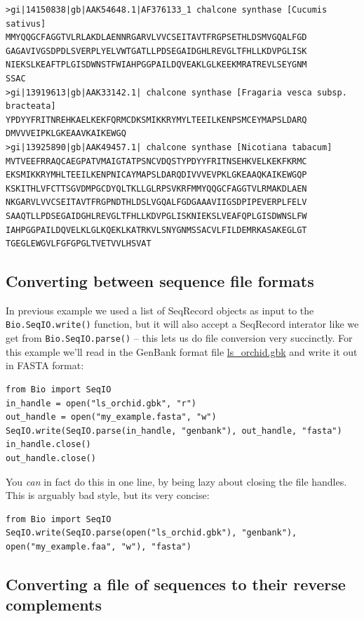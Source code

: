 \documentclass{report}
\begin{document}
\begin{verbatim}
>gi|14150838|gb|AAK54648.1|AF376133_1 chalcone synthase [Cucumis sativus]
MMYQQGCFAGGTVLRLAKDLAENNRGARVLVVCSEITAVTFRGPSETHLDSMVGQALFGD
GAGAVIVGSDPDLSVERPLYELVWTGATLLPDSEGAIDGHLREVGLTFHLLKDVPGLISK
NIEKSLKEAFTPLGISDWNSTFWIAHPGGPAILDQVEAKLGLKEEKMRATREVLSEYGNM
SSAC
>gi|13919613|gb|AAK33142.1| chalcone synthase [Fragaria vesca subsp. bracteata]
YPDYYFRITNREHKAELKEKFQRMCDKSMIKKRYMYLTEEILKENPSMCEYMAPSLDARQ
DMVVVEIPKLGKEAAVKAIKEWGQ
>gi|13925890|gb|AAK49457.1| chalcone synthase [Nicotiana tabacum]
MVTVEEFRRAQCAEGPATVMAIGTATPSNCVDQSTYPDYYFRITNSEHKVELKEKFKRMC
EKSMIKKRYMHLTEEILKENPNICAYMAPSLDARQDIVVVEVPKLGKEAAQKAIKEWGQP
KSKITHLVFCTTSGVDMPGCDYQLTKLLGLRPSVKRFMMYQQGCFAGGTVLRMAKDLAEN
NKGARVLVVCSEITAVTFRGPNDTHLDSLVGQALFGDGAAAVIIGSDPIPEVERPLFELV
SAAQTLLPDSEGAIDGHLREVGLTFHLLKDVPGLISKNIEKSLVEAFQPLGISDWNSLFW
IAHPGGPAILDQVELKLGLKQEKLKATRKVLSNYGNMSSACVLFILDEMRKASAKEGLGT
TGEGLEWGVLFGFGPGLTVETVVLHSVAT
\end{verbatim}

\subsection{Converting between sequence file formats}

In previous example we used a list of SeqRecord objects as input to the \verb|Bio.SeqIO.write()| function, but it will also accept a SeqRecord interator like we get from \verb|Bio.SeqIO.parse()| -- this lets us do file conversion very succinctly. For this example we'll read in the GenBank format file \href{http://biopython.org/DIST/docs/tutorial/examples/ls_orchid.gbk}{ls\_orchid.gbk} and write it out in FASTA format:

\begin{verbatim}
from Bio import SeqIO
in_handle = open("ls_orchid.gbk", "r")
out_handle = open("my_example.fasta", "w")
SeqIO.write(SeqIO.parse(in_handle, "genbank"), out_handle, "fasta")
in_handle.close()
out_handle.close()
\end{verbatim}

You {\it can} in fact do this in one line, by being lazy about closing the file handles. This is arguably bad style, but its very concise:

\begin{verbatim}
from Bio import SeqIO
SeqIO.write(SeqIO.parse(open("ls_orchid.gbk"), "genbank"), open("my_example.faa", "w"), "fasta")
\end{verbatim}

\subsection{Converting a file of sequences to their reverse complements}
\end{document}

